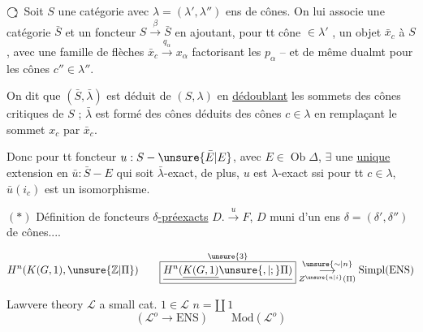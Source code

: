 $\bigcirc\!\!\!{\scriptstyle\genfrac{}{}{0pt}{}{*}{*}}$ Soit $S$ une catégorie avec $\lambda=(\lambda',\lambda'')$ ens de cônes. On lui associe une catégorie $\bar S$ et un foncteur $S\xrightarrow{\beta}\bar S$   en ajoutant, pour tt  cône  $\in\lambda'$ , un objet $\bar x_c$ à $S$, avec   une famille de flèches $\bar x_c\xrightarrow{q_\alpha}x_\alpha$ factorisant les $p_\alpha$ -- et de même dualmt pour les cônes $c''\in\lambda''$.

On dit que $(\bar S,\bar\lambda)$ est déduit de $(S,\lambda)$ en \uline{dédoublant} les sommets des cônes critiques de $S$ ; $\bar\lambda$ est formé des cônes déduits des cônes $c\in\lambda$ en remplaçant le sommet $x_c$ par $\bar x_c$.

Donc pour tt foncteur $u:S-\unsure{\bar E|E}$, avec $E\in\operatorname{Ob}\Delta$, $\exists$ une \uline{unique} extension en $\bar u:\bar S-E$ qui soit $\bar\lambda$-exact, de plus, $u$ est $\lambda$-exact ssi  pour tt $c\in\lambda$, $\bar u(i_c)$ est un isomorphisme.

$(*)$ Définition de foncteurs \uline{$\delta$-préexacts} $D.\xrightarrow{u}F$, $D$ muni d'un ens $\delta=(\delta',\delta'')$ de cônes....

\[
 H^n(K(G,1),\unsure{\mathbb Z|\Pi})\qquad
 \overset{\unsure{3}}{\boxed{\underline{H^n(\underline{K(G,1)}\unsure{,|;}\Pi)}}}
 \underset{Z^{\unsure{n|i}}(\Pi)}{\overset{\unsure{\sim|n}}{\longrightarrow}}\mathrm{Simpl}(\mathrm{ENS})
\]

Lawvere theory \qquad $\mathcal L$ a small cat. \qquad $1\in\mathcal L$ \qquad $n=\amalg\,1$
\[
 (\mathcal L^o\to\mathrm{ENS})\qquad \mathrm{Mod}(\mathcal L^o)
\]


